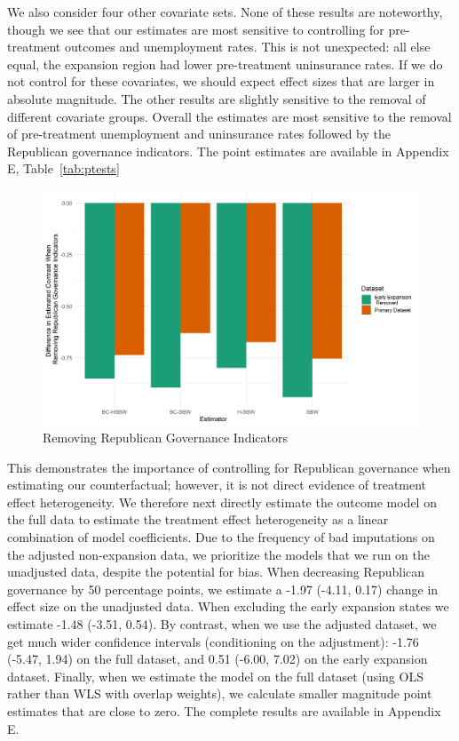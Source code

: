 \documentclass[aoas]{imsart}
\theoremstyle{plain}
\theoremstyle{remark}
\begin{document}
We also consider four other covariate sets. None of these results are noteworthy, though we see that our estimates are most sensitive to controlling for pre-treatment outcomes and unemployment rates. This is not unexpected: all else equal, the expansion region had lower pre-treatment uninsurance rates. If we do not control for these covariates, we should expect effect sizes that are larger in absolute magnitude. The other results are slightly sensitive to the removal of different covariate groups. Overall the estimates are most sensitive to the removal of pre-treatment unemployment and uninsurance rates followed by the Republican governance indicators. The point estimates are available in Appendix E, Table~\ref{tab:ptests}

\begin{figure}[H]
\begin{center}
    \caption{Removing Republican Governance Indicators}
    \label{fig:repub}
    \includegraphics[scale=0.6]{01_Plots/repub-diff-c1c2.png}
\end{center}
\end{figure}

This demonstrates the importance of controlling for Republican governance when estimating our counterfactual; however, it is not direct evidence of treatment effect heterogeneity. We therefore next directly estimate the outcome model on the full data to estimate the treatment effect heterogeneity as a linear combination of model coefficients. Due to the frequency of bad imputations on the adjusted non-expansion data, we prioritize the models that we run on the unadjusted data, despite the potential for bias. When decreasing Republican governance by 50 percentage points, we estimate a -1.97 (-4.11, 0.17) change in effect size on the unadjusted data. When excluding the early expansion states we estimate -1.48 (-3.51, 0.54). By contrast, when we use the adjusted dataset, we get much wider confidence intervals (conditioning on the adjustment): -1.76 (-5.47, 1.94) on the full dataset, and 0.51 (-6.00, 7.02) on the early expansion dataset. Finally, when we estimate the model on the full dataset (using OLS rather than WLS with overlap weights), we calculate smaller magnitude point estimates that are close to zero. The complete results are available in Appendix E.
\end{document}
